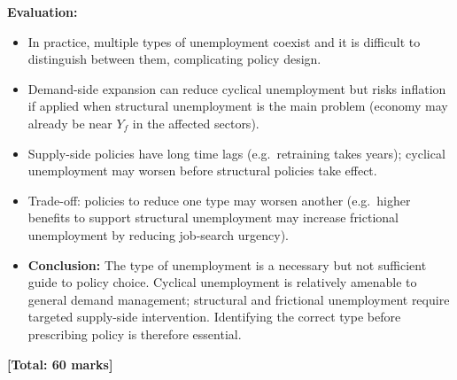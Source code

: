 \documentclass[12pt,a4paper]{article}
\begin{document}
\vspace{0.3em}
\textbf{Evaluation:}
\begin{itemize}
    \item In practice, multiple types of unemployment coexist and it is difficult to distinguish between them, complicating policy design.
    \item Demand-side expansion can reduce cyclical unemployment but risks inflation if applied when structural unemployment is the main problem (economy may already be near $Y_f$ in the affected sectors).
    \item Supply-side policies have long time lags (e.g.\ retraining takes years); cyclical unemployment may worsen before structural policies take effect.
    \item Trade-off: policies to reduce one type may worsen another (e.g.\ higher benefits to support structural unemployment may increase frictional unemployment by reducing job-search urgency).
    \item \textbf{Conclusion:} The type of unemployment is a necessary but not sufficient guide to policy choice. Cyclical unemployment is relatively amenable to general demand management; structural and frictional unemployment require targeted supply-side intervention. Identifying the correct type before prescribing policy is therefore essential.
\end{itemize}

\vfill
\begin{center}
    \textbf{[Total: 60 marks]}
\end{center}
\end{document}

